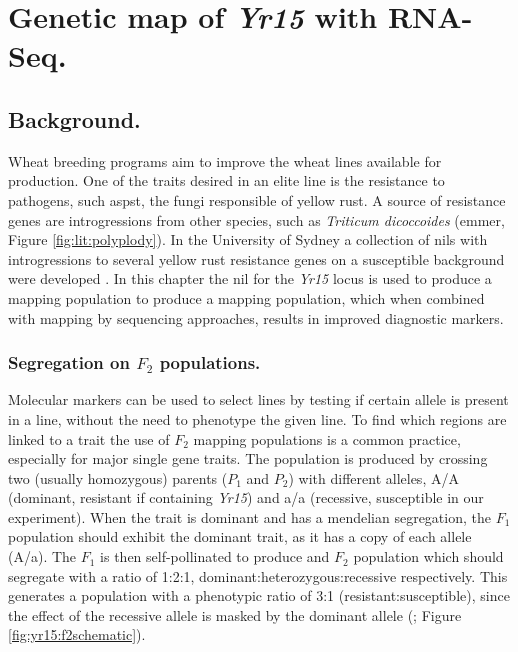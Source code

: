 
\chapter{Genetic map of \textit{Yr15} with RNA-Seq.}
\glsresetall
{}
\label{yr15}
 
\section{Background.}
Wheat breeding programs aim to improve the wheat lines available for production.
One of the traits desired in an elite line is the resistance to pathogens, such as\gls{pst}, the fungi responsible of yellow rust.
A source of resistance genes are introgressions from other species, such as \textit{Triticum dicoccoides} (emmer, Figure \ref{fig:lit:polyplody}). 
In the University of Sydney a collection of \glspl{nil} with introgressions to several yellow rust resistance genes on a susceptible background were developed \citep{Wellings1998}. 
In this chapter the \gls{nil} for the \textit{Yr15} locus is used to produce a mapping population to produce a mapping population, which when combined with mapping by sequencing approaches, results in improved diagnostic markers. 

\subsection{Segregation on \texorpdfstring{$F_{2}$}{F2} populations.}
\label{yr15:f2}
Molecular markers can be used to select lines by testing if certain allele is present in a line, without the need to phenotype  the given line.
To find which regions are linked to a trait the use of $F_{2}$ mapping populations is a common practice, especially for major single gene traits.
The population is produced by crossing two (usually homozygous) parents ($P_1$ and $P_{2}$) with different alleles, A/A (dominant, resistant if containing \textit{Yr15}) and a/a (recessive, susceptible in our experiment).
When the trait is dominant and has a mendelian segregation, the $F_1$ population should exhibit the dominant trait, as it has a copy of each allele (A/a). 
The $F_1$ is then self-pollinated to produce and $F_2$ population which should segregate with a ratio of 1:2:1, dominant:heterozygous:recessive respectively.
This generates a population with a phenotypic ratio of 3:1 (resistant:susceptible), since the effect of the recessive allele is masked by the dominant allele (\citealt{VanOoijen2013}; Figure \ref{fig:yr15:f2schematic}).  

